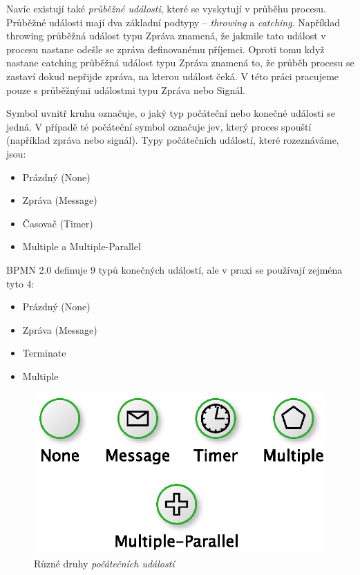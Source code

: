 Navíc existují také \textit{průběžné události}, které se vyskytují v průběhu procesu. Průběžné události mají dva základní podtypy – \textit{throwing} a \textit{catching}. Například throwing průběžná událost typu Zpráva znamená, že jakmile tato událost v procesu nastane odešle se zpráva definovanému příjemci. Oproti tomu když nastane catching průběžná událost typu Zpráva znamená to, že průběh procesu se zastaví dokud nepřijde zpráva, na kterou událost čeká. V této práci pracujeme pouze s průběžnými událostmi typu Zpráva nebo Signál.

Symbol uvnitř kruhu označuje, o jaký typ počáteční nebo konečné události se jedná. V případě té počáteční symbol označuje jev, který proces spouští (například zpráva nebo signál). Typy počátečních událostí, které rozeznáváme, jsou:

\begin{itemize}
\item Prázdný (None)
\item Zpráva (Message)
\item Časovač (Timer)
\item Multiple a Multiple-Parallel
\end{itemize}

BPMN 2.0 definuje 9 typů konečných událostí, ale v praxi se používají zejména tyto 4: \cite{Silver2011}

\begin{itemize}
\item Prázdný (None)
\item Zpráva (Message)
\item Terminate
\item Multiple
\end{itemize}

\begin{figure}[htbp]\centering
\includegraphics{obrazky/start-events}
\caption{Různé druhy \textit{počátečních událostí}}
\label{fig:pocatecni_udalosti}
\end{figure}


